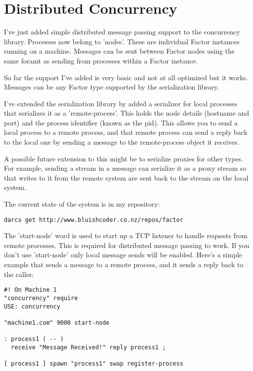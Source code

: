 \chapter{Distributed Concurrency}\label{distributedconcurrency}

I've just added simple distributed message passing support to the
concurrency library. Processes now belong to 'nodes'. These are
individual Factor instances running on a machine. Messages can be sent
between Factor nodes using the same foramt as sending from processes
within a Factor instance.

So far the support I've added is very basic and not at all optimized
but it works. Messages can be any Factor type supported by the
serialization library.

I've extended the serialization library by added a serializer for
local processes that serializes it as a 'remote-process'. This holds
the node details (hostname and port) and the process identifier (known
as the pid). This allows you to send a local process to a remote
process, and that remote process can send a reply back to the local
one by sending a message to the remote-process object it receives.

A possible future extension to this might be to serialize proxies for
other types. For example, sending a stream in a message can serialize
it as a proxy stream so that writes to it from the remote system are
sent back to the stream on the local system.

The current state of the system is in my repository:

\begin{verbatim}
darcs get http://www.bluishcoder.co.nz/repos/factor
\end{verbatim}


The 'start-node' word is used to start up a TCP listener to handle
requests from remote processes. This is required for distributed
message passing to work. If you don't use 'start-node' only local
message sends will be enabled. Here's a simple example that sends a
message to a remote process, and it sends a reply back to the caller:

\begin{verbatim}
#! On Machine 1
"concurrency" require
USE: concurrency

"machine1.com" 9000 start-node

: process1 ( -- )
  receive "Message Received!" reply process1 ;

[ process1 ] spawn "process1" swap register-process
\end{verbatim}


